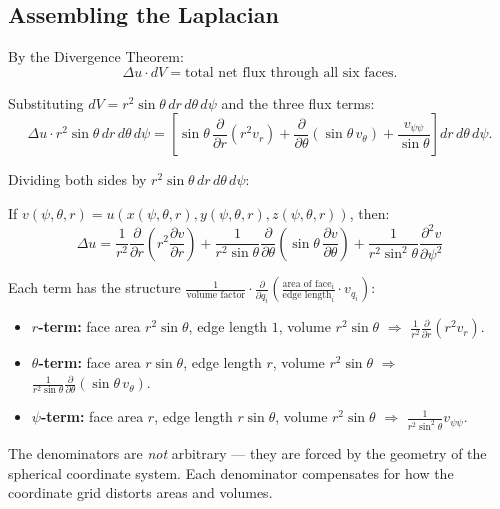 \documentclass[11pt]{report}
\newcommand{\parti}[2]{\frac{\partial #1}{\partial #2}}
\begin{document}
\subsection{Assembling the Laplacian}

By the Divergence Theorem:
\[
\Delta u \cdot dV = \text{total net flux through all six faces}.
\]

Substituting $dV = r^2\sin\theta \, dr \, d\theta \, d\psi$ and the three flux terms:
\[
\Delta u \cdot r^2\sin\theta \, dr \, d\theta \, d\psi = \left[\sin\theta \, \parti{}{r}(r^2 v_r) + \parti{}{\theta}(\sin\theta \, v_\theta) + \frac{v_{\psi\psi}}{\sin\theta}\right] dr \, d\theta \, d\psi.
\]

Dividing both sides by $r^2\sin\theta \, dr \, d\theta \, d\psi$:

\begin{theorem}
If $v(\psi, \theta, r) = u(x(\psi, \theta, r), y(\psi, \theta, r), z(\psi, \theta, r))$, then:
\[
\boxed{\Delta u = \frac{1}{r^2}\parti{}{r}\!\left(r^2 \parti{v}{r}\right) + \frac{1}{r^2\sin\theta}\parti{}{\theta}\!\left(\sin\theta \, \parti{v}{\theta}\right) + \frac{1}{r^2\sin^2\!\theta}\frac{\partial^2 v}{\partial \psi^2}}
\]
\end{theorem}

\begin{remark}
Each term has the structure $\frac{1}{\text{volume factor}} \cdot \parti{}{q_i}\!\left(\frac{\text{area of face}_i}{\text{edge length}_i} \cdot v_{q_i}\right)$:
\begin{itemize}
    \item \textbf{$r$-term:} face area $r^2\sin\theta$, edge length $1$, volume $r^2\sin\theta$ $\Rightarrow$ $\frac{1}{r^2}\parti{}{r}(r^2 v_r)$.
    \item \textbf{$\theta$-term:} face area $r\sin\theta$, edge length $r$, volume $r^2\sin\theta$ $\Rightarrow$ $\frac{1}{r^2\sin\theta}\parti{}{\theta}(\sin\theta \, v_\theta)$.
    \item \textbf{$\psi$-term:} face area $r$, edge length $r\sin\theta$, volume $r^2\sin\theta$ $\Rightarrow$ $\frac{1}{r^2\sin^2\theta}v_{\psi\psi}$.
\end{itemize}

The denominators are \textit{not} arbitrary --- they are forced by the geometry of the spherical coordinate system. Each denominator compensates for how the coordinate grid distorts areas and volumes.
\end{remark}
\end{document}
